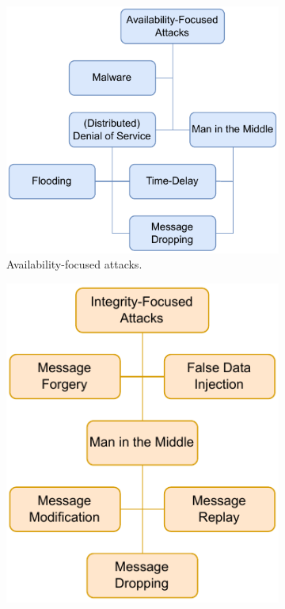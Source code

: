 \begin{figure}
    \centering
    \begin{subfigure}[t]{0.38\linewidth}
        \centering
        \includegraphics[width=\linewidth]{figures/attacks_availability.drawio.pdf}
        \caption{Availability-focused attacks.}
        \label{fig:attacks_availability}
    \end{subfigure}
    \hfill
    \begin{subfigure}[t]{0.295\linewidth}
        \centering
        \includegraphics[width=\linewidth]{figures/attacks_integrity.drawio.pdf}

\end{subfigure}
\end{figure}
